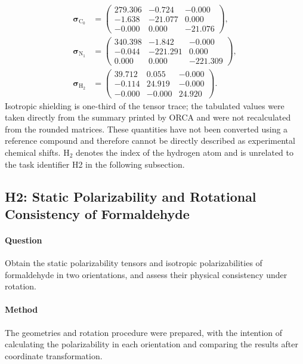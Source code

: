 \begin{equation}
  \begin{aligned}
    \bm{\sigma}_{\mathrm{C}_0}&=\begin{pmatrix}
      279.306 & -0.724 & -0.000 \\
      -1.638 & -21.077 & 0.000 \\
      -0.000 & 0.000 & -21.076
    \end{pmatrix},\\[0.8em]
    \bm{\sigma}_{\mathrm{N}_1}&=\begin{pmatrix}
      340.398 & -1.842 & -0.000 \\
      -0.044 & -221.291 & 0.000 \\
      0.000 & 0.000 & -221.309
    \end{pmatrix},\\[0.8em]
    \bm{\sigma}_{\mathrm{H}_2}&=\begin{pmatrix}
      39.712 & 0.055 & -0.000 \\
      -0.114 & 24.919 & -0.000 \\
      -0.000 & -0.000 & 24.920
    \end{pmatrix}.
  \end{aligned}
  \label{eq:h1-tensors}
\end{equation}
Isotropic shielding is one-third of the tensor trace; the tabulated values were taken directly from the summary printed by ORCA and were not recalculated from the rounded matrices.
These quantities have not been converted using a reference compound and therefore cannot be directly described as experimental chemical shifts.
H$_2$ denotes the index of the hydrogen atom and is unrelated to the task identifier H2 in the following subsection.

\subsection{H2: Static Polarizability and Rotational Consistency of Formaldehyde}
\paragraph{Question}
Obtain the static polarizability tensors and isotropic polarizabilities of formaldehyde in two orientations, and assess their physical consistency under rotation.

\paragraph{Method}
The geometries and rotation procedure were prepared, with the intention of calculating the polarizability in each orientation and comparing the results after coordinate transformation.

